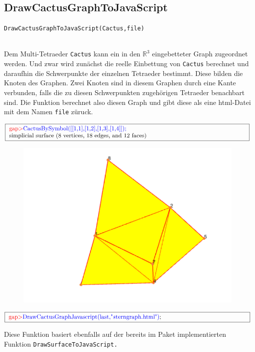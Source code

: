 \documentclass[12pt,titlepage,twoside,cleardoublepage]{article}
\theoremstyle{nummermitklammern}
\numberwithin{equation}{section}
\begin{document}
\subsection{DrawCactusGraphToJavaScript}
\begin{large}
\texttt{DrawCactusGraphToJavaScript(Cactus,file)}
\end{large}\\
Dem Multi-Tetraeder \texttt{Cactus} kann ein in den $\mathbb{R}^3$ eingebetteter Graph zugeordnet werden. Und zwar wird zunächst die reelle Einbettung von \texttt{Cactus} berechnet und daraufhin die Schwerpunkte der einzelnen Tetraeder bestimmt. Diese bilden die Knoten des Graphen. Zwei Knoten sind in diesem Graphen durch eine Kante verbunden, falls die zu diesen Schwerpunkten zugehörigen Tetraeder benachbart sind.
Die Funktion berechnet also diesen Graph und gibt diese als eine html-Datei mit dem Namen \texttt{file} züruck.
\begin{center} 
$\fbox{
\parbox{14cm}{
\textcolor{red}{gap$>$}\textcolor{blue}{ CactusBySymbol([[1,1],[1,2],[1,3],[1,4]]);}\newline
simplicial surface (8 vertices, 18 edges, and 12 faces)
}}$
 \begin{figure}[H]
\begin{center}
\includegraphics[scale=0.5,viewport=0cm 1.5cm 18cm 13cm]{stern2}
\end{center}
\end{figure}
$\fbox{
\parbox{14cm}{
\textcolor{red}{gap$>$}\textcolor{blue}{DrawCactusGraphJavascript(last,"$s$terngraph.html")};
}
}$
\end{center}
Diese Funktion basiert ebenfalls auf der bereits im Paket implementierten Funktion \texttt{DrawSurfaceToJavaScript.}
\end{document}
